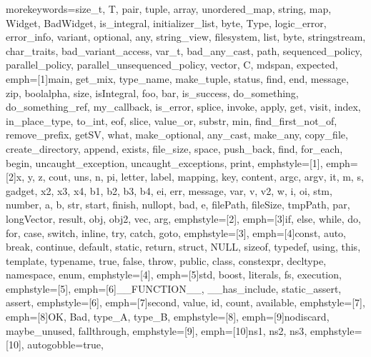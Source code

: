 {morekeywords={size_t, T, pair, tuple, array, unordered_map, string, map, Widget,
              BadWidget, is_integral, initializer_list, byte, Type, logic_error,
              error_info, variant, optional, any, string_view, filesystem, list, byte,
              stringstream, char_traits, bad_variant_access, var_t, bad_any_cast, path,
              sequenced_policy, parallel_policy, parallel_unsequenced_policy, vector, C,
              mdspan, expected},
emph=[1]{main, get_mix, type_name, make_tuple, status, find, end, message, zip, boolalpha, size,
         isIntegral,  foo, bar, is_success, do_something, do_something_ref, my_callback, is_error,
         splice, invoke, apply, get, visit, index, in_place_type, to_int, eof, slice, value_or,
         substr, min, find_first_not_of, remove_prefix, getSV, what, make_optional, any_cast, make_any,
         copy_file, create_directory, append, exists, file_size, space, push_back, find,
         for_each, begin, uncaught_exception, uncaught_exceptions, print},
emphstyle=[1]{\color{NavyBlue}}, %
emph=[2]{x, y, z, cout, uns, n, pi, letter, label, mapping, key, content, argc, argv, it, m, s,
         gadget, x2, x3, x4, b1, b2, b3, b4, ei, err, message, var, v, v2, w, i, oi, stm, number, a, b,
         str, start, finish, nullopt, bad, e, filePath, fileSize, tmpPath, par, longVector, result,
         obj, obj2, vec, arg},
emphstyle=[2]{\color{Orange}}, %
emph=[3]{if, else, while, do, for, case, switch, inline, try, catch, goto},
emphstyle=[3]{\color{violet}}, %
emph=[4]{const, auto, break, continue, default, static, return, struct, NULL, sizeof, typedef, using, this,
         template, typename, true, false, throw, public, class, constexpr, decltype, namespace, enum},
emphstyle=[4]{\color{ProcessBlue}}, %
emph=[5]{std, boost, literals, fs, execution},
emphstyle=[5]{\color{Maroon}}, %
emph=[6]{__FUNCTION__, __has_include, static_assert, assert},
emphstyle=[6]{\color{Gray}}, %
emph=[7]{second, value, id, count, available},
emphstyle=[7]{\color{Peach!50!Purple}}, %
emph=[8]{OK, Bad, type_A, type_B},
emphstyle=[8]{\color{Blue}}, %
emph=[9]{nodiscard, maybe_unused, fallthrough},
emphstyle=[9]{\color{Goldenrod!50!black}}, %
emph=[10]{ns1, ns2, ns3},
emphstyle=[10]{\color{MediumSeaGreen}}, %
autogobble=true, %
}


